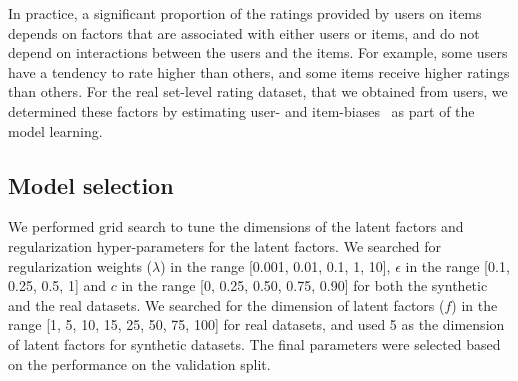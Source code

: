 In practice, 
a significant proportion of the ratings provided by users on items
depends on factors that are associated with either users or items, and do not
depend on interactions between the users and the items. For example, some users
have a tendency to rate higher than others, and some items receive higher
ratings than others. For the real set-level rating dataset, that we obtained from
\ML users, we determined these factors by estimating user- and
item-biases~\cite{koren2009matrix} as part of the model learning.




\iffalse
We followed the above procedure on all the splits of synthetic datasets
generated using the approaches described in Section~\ref{ch:lfs:evaldata} and report average value
of the performance assessment metrics for each of the approaches. 
Similarly we repeated the above process five times for \MLREALSETS  and report
the average value of metrics across the runs.  
\fi



\subsection{Model selection}
We performed grid search to tune the dimensions of the latent factors and
regularization hyper-parameters for the latent factors. 
We searched
for regularization weights ($\lambda$) in the range [0.001, 0.01, 0.1, 1, 10],
$\epsilon$ in the range [0.1, 0.25, 0.5, 1] and $c$ in the range [0, 0.25, 0.50,
0.75, 0.90] for both the synthetic and the real
datasets.
We searched for the dimension of latent factors ($f$) in the range [1, 5, 10,
15, 25, 50, 75, 100] for real datasets, and used 5 as the dimension
of latent factors for synthetic datasets.
The final
parameters were selected based on the performance on the validation split. 

